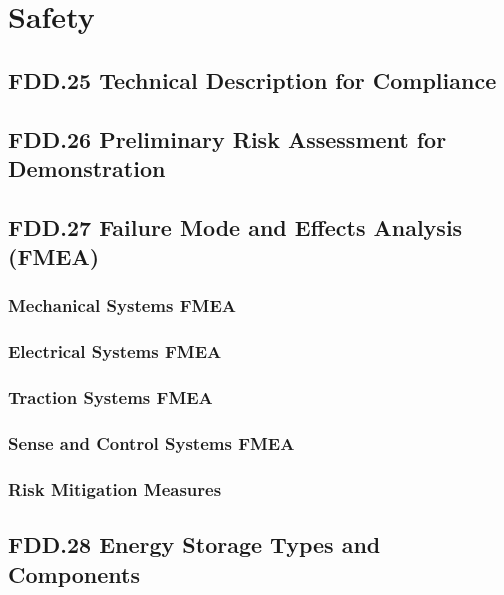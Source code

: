 \chapter{Safety}

\section{FDD.25 Technical Description for Compliance}

\section{FDD.26 Preliminary Risk Assessment for Demonstration}

\section{FDD.27 Failure Mode and Effects Analysis (FMEA)}
\subsection{Mechanical Systems FMEA}
\subsection{Electrical Systems FMEA}
\subsection{Traction Systems FMEA}
\subsection{Sense and Control Systems FMEA}
\subsection{Risk Mitigation Measures}

\section{FDD.28 Energy Storage Types and Components}

